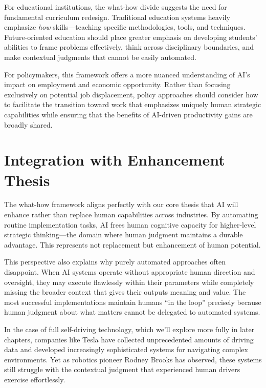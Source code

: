 \documentclass[
  Letterpaper,
]{scrbook}
\begin{document}
For educational institutions, the what-how divide suggests the need for
fundamental curriculum redesign. Traditional education systems heavily
emphasize \emph{how} skills---teaching specific methodologies, tools,
and techniques. Future-oriented education should place greater emphasis
on developing students' abilities to frame problems effectively, think
across disciplinary boundaries, and make contextual judgments that
cannot be easily automated.

For policymakers, this framework offers a more nuanced understanding of
AI's impact on employment and economic opportunity. Rather than focusing
exclusively on potential job displacement, policy approaches should
consider how to facilitate the transition toward work that emphasizes
uniquely human strategic capabilities while ensuring that the benefits
of AI-driven productivity gains are broadly shared.

\section{Integration with Enhancement
Thesis}\label{integration-with-enhancement-thesis}

The what-how framework aligns perfectly with our core thesis that AI
will enhance rather than replace human capabilities across industries.
By automating routine implementation tasks, AI frees human cognitive
capacity for higher-level strategic thinking---the domain where human
judgment maintains a durable advantage. This represents not replacement
but enhancement of human potential.

This perspective also explains why purely automated approaches often
disappoint. When AI systems operate without appropriate human direction
and oversight, they may execute flawlessly within their parameters while
completely missing the broader context that gives their outputs meaning
and value. The most successful implementations maintain humans ``in the
loop'' precisely because human judgment about what matters cannot be
delegated to automated systems.

In the case of full self-driving technology, which we'll explore more
fully in later chapters, companies like Tesla have collected
unprecedented amounts of driving data and developed increasingly
sophisticated systems for navigating complex environments. Yet as
robotics pioneer Rodney Brooks has observed, these systems still
struggle with the contextual judgment that experienced human drivers
exercise effortlessly.
\end{document}
